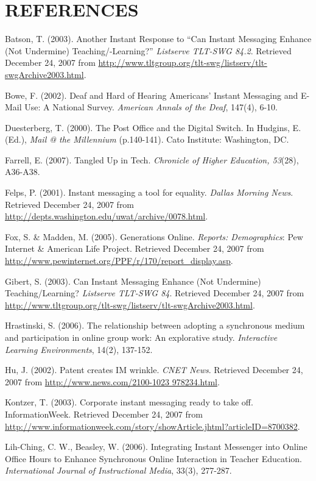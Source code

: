 \documentclass[11.5pt]{sig-alternate} %
\begin{document}
\section*{REFERENCES}\par 

\leftskip 0.25in
\parindent -0.25in 
Batson, T. (2003). Another Instant Response to “Can Instant Messaging Enhance (Not Undermine) Teaching/-Learning?” \textit{Listserve TLT-SWG 84.2}. Retrieved December 24, 2007 from \url{http://www.tltgroup.org/tlt-swg/listserv/tlt-swgArchive2003.html}. 

Bowe, F. (2002). Deaf and Hard of Hearing Americans' Instant Messaging and E-Mail Use: A National Survey. \textit{American Annals of the Deaf}, 147(4), 6-10. 

Duesterberg, T. (2000). The Post Office and the Digital Switch. In Hudgins, E. (Ed.), \textit{Mail @ the Millennium} (p.140-141). Cato Institute: Washington, DC. 

Farrell, E. (2007). Tangled Up in Tech. \textit{Chronicle of Higher Education, 53}(28), A36-A38. 

Felps, P. (2001). Instant messaging a tool for equality. \textit{Dallas Morning News}. Retrieved December 24, 2007 from \url{http://depts.washington.edu/uwat/archive/0078.html}. 

Fox, S. \& Madden, M. (2005). Generations Online. \textit{Reports: Demographics}: Pew Internet \& American Life Project. Retrieved December 24, 2007 from \url{http://www.pewinternet.org/PPF/r/170/report\_display.asp}. 

Gibert, S. (2003). Can Instant Messaging Enhance (Not Undermine) Teaching/Learning? \textit{Listserve TLT-SWG 84}. Retrieved December 24, 2007 from \url{http://www.tltgroup.org/tlt-swg/listserv/tlt-swgArchive2003.html}. 

Hrastinski, S. (2006). The relationship between adopting a synchronous medium and participation in online group work: An explorative study. \textit{Interactive Learning Environments}, 14(2), 137-152. 

Hu, J. (2002). Patent creates IM wrinkle. \textit{CNET News}. Retrieved December 24, 2007 from \url{http://www.news.com/2100-1023 978234.html}. 

Kontzer, T. (2003). Corporate instant messaging ready to take off. InformationWeek. Retrieved December 24, 2007 from \url{http://www.informationweek.com/story/showArticle.jhtml?articleID=8700382}. 

Lih-Ching, C. W., Beasley, W. (2006). Integrating Instant Messenger into Online Office Hours to Enhance Synchronous Online Interaction in Teacher Education. \textit{International Journal of Instructional Media}, 33(3), 277-287. 
\end{document}
